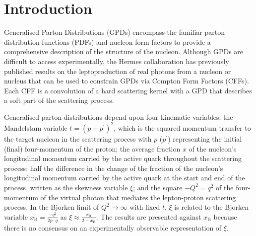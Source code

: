 \section{Introduction}
Generalised Parton Distributions (GPDs)
\cite{Mue94,Ji97a,Rad97} encompass the familiar parton
distribution functions (PDFs) and nucleon form factors to provide a
comprehensive description of the structure of the nucleon.
Although GPDs are difficult to access experimentally, the H{\sc ermes}
collaboration has previously published results
\cite{Air01,Air06,Air08,Air09,Air10, Air10a, Air10b, Air11} on
the leptoproduction of real photons from a nucleon or nucleus that can be used to constrain GPDs via Compton Form Factors (CFFs). Each CFF is a convolution of a hard scattering kernel with a GPD that describes a soft part of the scattering process.

Generalised parton distributions depend upon four kinematic variables: the
Mandelstam variable $t=(p-p^{\prime})^2$, which is the squared momentum
transfer to the target nucleon in the scattering process with $p$ ($p^{\prime}$)
representing the initial (final) four-momentum of the proton; the average
fraction $x$ of the nucleon's longitudinal momentum carried by the active
quark throughout the scattering process; half the difference in the
change of the fraction of the nucleon's longitudinal momentum carried by the
active quark at the start and end of the process, written as the skewness
variable $\xi$; and the square $-Q^2=q^2$ of the four-momentum of the virtual photon that mediates the lepton-proton scattering process. In the Bjorken limit of $Q^2\rightarrow\infty$ with
fixed $t$, $\xi$ is related to the Bjorken variable
$x_{\textrm{B}}=\frac{-q^2}{2p\cdot q}$ as
$\xi\approx\frac{x_\textrm{B}}{2-x_\textrm{B}}$. The results are presented
against $x_{\textrm{B}}$ because there is no consensus on an experimentally
observable representation of $\xi$. 

